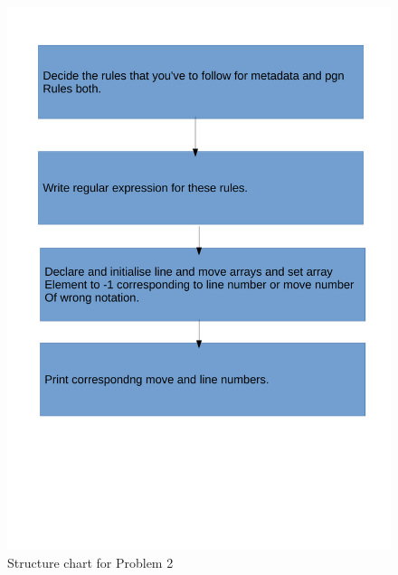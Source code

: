 \documentclass[11pt]{report}
\begin{document}
\begin{figure}[h!]
\centering
\includegraphics[scale=0.5]{images/sc1}
\caption{Structure chart for Problem 2}	
\end{figure}
\pagebreak
\end{document}
